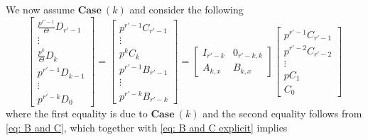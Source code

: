 \documentclass[11pt]{amsart}
\theoremstyle{definition}
\numberwithin{equation}{subsection}
\theoremstyle{plain}
\theoremstyle{plain}
\theoremstyle{plain}
\theoremstyle{plain}
\theoremstyle{plain}
\theoremstyle{plain}
\theoremstyle{plain}
\theoremstyle{plain}
\theoremstyle{plain}
\theoremstyle{plain}
\theoremstyle{plain}
\theoremstyle{plain}
\theoremstyle{definition}
\theoremstyle{definition}
\theoremstyle{definition}
\theoremstyle{remark}
\renewcommand{\(}{\textup{(}}
\renewcommand{\)}{\textup{)}}
\begin{document}
We now assume $\mathbf{Case}~(k)$ and consider the following
\begin{equation}\label{eq: D and C matrix}
    \begin{bmatrix}
        \frac{p^{r'-1}}{\Theta}D_{r'-1}\\
        \vdots\\
        \frac{p^k}{\Theta}D_k\\
        p^{r'-1}D_{k-1}\\
        \vdots\\
        p^{r'-k}D_0
    \end{bmatrix}
    =
    \begin{bmatrix}
        p^{r'-1}C_{r'-1}\\
        \vdots\\
        p^kC_k\\
        p^{r'-1}B_{r'-1}\\
        \vdots\\
        p^{r'-k}B_{r'-k}
    \end{bmatrix}
    =
    \begin{bmatrix}
        I_{r'-k} & 0_{r'-k,k}\\
        A_{k,x} & B_{k,x}
    \end{bmatrix}
    \begin{bmatrix}
        p^{r'-1}C_{r'-1}\\
        p^{r'-2}C_{r'-2}\\
        \vdots\\
        pC_1\\
        C_0
    \end{bmatrix}
\end{equation}
where the first equality is due to $\mathbf{Case}~(k)$ and the second equality follows from \eqref{eq: B and C}, which together with \eqref{eq: B and C explicit} implies
\end{document}
